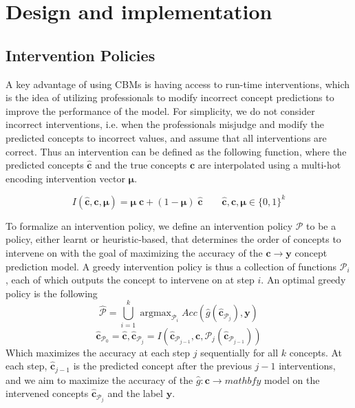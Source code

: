 \documentclass[../main.tex]{subfiles}
\begin{document}
\chapter{Design and implementation}


\section{Intervention Policies}

A key advantage of using CBMs is having access to 
run-time interventions, which is the idea of utilizing professionals
to modify incorrect concept predictions to improve the 
performance of the model.
For simplicity, we do not consider incorrect interventions, 
i.e. when the professionals misjudge and modify
 the predicted concepts to incorrect values,
and assume that
all interventions are correct. Thus an intervention
can be defined as the following function, where
the predicted concepts $\hat{\mathbf{c}}$ and the true concepts $\mathbf{c}$ are interpolated
using a multi-hot encoding intervention vector $\bm{\mu}$.

\[I(\hat{\mathbf{c}}, \mathbf{c}, \bm{\mu}) = 
\bm{\mu} \; \mathbf{c} + (1 - \bm{\mu}) \; \hat{\mathbf{c}} \qquad \hat{\mathbf{c}}, \mathbf{c}, \bm{\mu} \in \{0, 1\}^k\]

To formalize an intervention policy, we define an intervention policy $\mathcal{P}$ 
to be a policy, either learnt
or heuristic-based, that determines the order of concepts to intervene 
on with the goal of maximizing the accuracy of the $\mathbf{c} \to \mathbf{y}$ concept prediction model.
A greedy intervention policy is thus a collection of functions $\mathcal{P}_i$, each
of which outputs the concept to intervene on at step $i$. An optimal greedy policy is the following
\[\hat{\mathcal{P}} = \bigcup_{i=1}^k \mathop{\mathrm{argmax}}_{\mathcal{P}_i} Acc(\hat{g}(\hat{\mathbf{c}}_{\mathcal{P}_j}), \mathbf{y}) \]
\[\hat{\mathbf{c}}_{\mathcal{P}_0} = \hat{\mathbf{c}}, \hat{\mathbf{c}}_{\mathcal{P}_j} = I(\hat{\mathbf{c}}_{\mathcal{P}_{j-1}}, \mathbf{c}, \mathcal{P}_j(\hat{\mathbf{c}}_{\mathcal{P}_{j-1}}))\]
Which maximizes the accuracy at each step $j$ sequentially
for all $k$ concepts. At each
step, $\hat{\mathbf{c}}_{j-1}$ is 
the predicted concept after the previous $j-1$ interventions,
and we aim to maximize the accuracy of the $\hat{g}: \mathbf{c} \to mathbf{y}$ model
on the intervened concepts $\hat{\mathbf{c}}_{\mathcal{P}_j}$ and the label $\mathbf{y}$.
\end{document}
